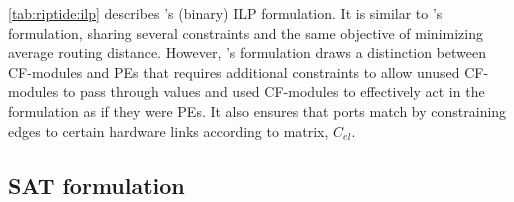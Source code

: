 \autoref{tab:riptide:ilp} describes \riptide's (binary) ILP formulation.
% 
It is similar to \snafu's formulation, sharing several constraints and the same objective of minimizing average routing distance.
% 
However, \riptide's formulation draws a distinction between CF-modules and PEs that requires additional constraints to allow unused CF-modules to pass through values and used CF-modules to effectively act in the formulation as if they were PEs.
% 
It also ensures that ports match by constraining edges to certain hardware links according to matrix, $C_{el}$.

\subsection{SAT formulation}

